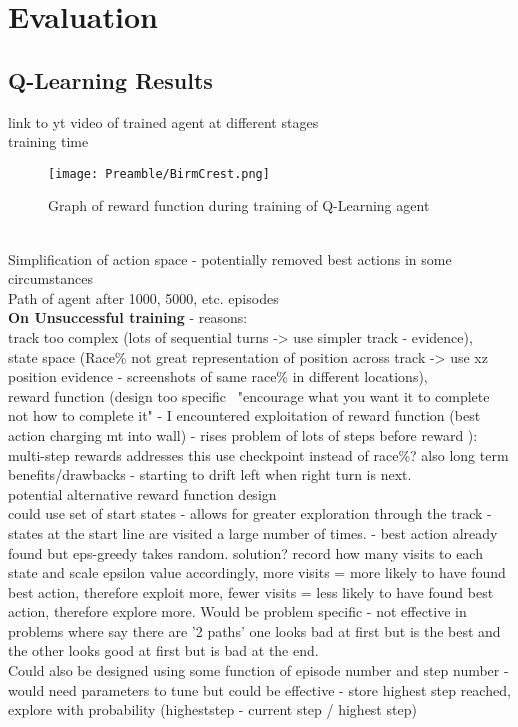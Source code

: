 
\chapter{Evaluation}

\section{Q-Learning Results}
link to yt video of trained agent at different stages\\
training time \\
\begin{figure}
    \centering
    \texttt{[image: Preamble/BirmCrest.png]}
    \caption{Graph of reward function during training of Q-Learning agent}
    \label{fig:training-reward-q}
\end{figure}
\\Simplification of action space - potentially removed best actions in some circumstances
\\Path of agent after 1000, 5000, etc. episodes
\\ \textbf{On Unsuccessful training} - reasons: \\track too complex (lots of sequential turns -> use simpler track - evidence), \\state space (Race\% not great representation of position across track -> use xz position evidence - screenshots of same race\% in different locations), \\reward function (design too specific \cite{sutton2018reinforcement} ~"encourage what you want it to complete not how to complete it" - I encountered exploitation of reward function (best action charging mt into wall) - rises problem of lots of steps before reward \cite{mnih2013playing}): multi-step rewards addresses this use checkpoint instead of race\%? also long term benefits/drawbacks - starting to drift left when right turn is next.
\\potential alternative reward function design
\\could use set of start states - allows for greater exploration through the track - states at the start line are visited a large number of times. - best action already found but eps-greedy takes random. solution? record how many visits to each state and scale epsilon value accordingly, more visits = more likely to have found best action, therefore exploit more, fewer visits = less likely to have found best action, therefore explore more. Would be problem specific - not effective in problems where say there are '2 paths' one looks bad at first but is the best and the other looks good at first but is bad at the end. \\Could also be designed using some function of episode number and step number - would need parameters to tune but could be effective - store highest step reached, explore with probability (higheststep - current step / highest step)



